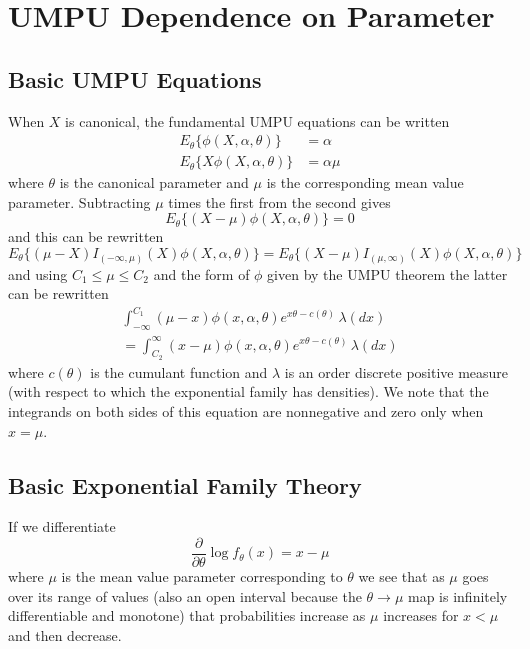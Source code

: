 \documentclass[11pt]{article}
\begin{document}
\section{UMPU Dependence on Parameter}

\subsection{Basic UMPU Equations}

When $X$ is canonical, the fundamental UMPU equations can be written
\begin{subequations}
\begin{align}
   E_\theta\{ \phi(X, \alpha, \theta) \} & = \alpha
   \label{eq:umpu-a}
   \\
   E_\theta\{ X \phi(X, \alpha, \theta) \} & = \alpha \mu
   \label{eq:umpu-b}
\end{align}
\end{subequations}
where $\theta$ is the canonical parameter and $\mu$ is the corresponding
mean value parameter.
Subtracting $\mu$ times the first from the second gives
$$
   E_\theta\{ (X - \mu) \phi(X, \alpha, \theta) \} = 0
$$
and this can be rewritten
$$
   E_\theta\{ (\mu - X) I_{(- \infty, \mu)}(X) \phi(X, \alpha, \theta) \}
   =
   E_\theta\{ (X - \mu) I_{(\mu, \infty)}(X) \phi(X, \alpha, \theta) \}
$$
and using $C_1 \le \mu \le C_2$ and the form of $\phi$ given
by the UMPU theorem the latter can be rewritten
\begin{multline*}
   \int_{- \infty}^{C_1} (\mu - x) \phi(x, \alpha, \theta)
   e^{x \theta - c(\theta)} \, \lambda(d x)
   \\
   =
   \int_{C_2}^\infty (x - \mu) \phi(x, \alpha, \theta)
   e^{x \theta - c(\theta)} \, \lambda(d x)
\end{multline*}
where $c(\theta)$ is the cumulant function and $\lambda$ is an order
discrete positive measure (with respect to which the exponential family
has densities).  We note that the integrands on both sides of this
equation are nonnegative and zero only when $x = \mu$.

\subsection{Basic Exponential Family Theory}

If we differentiate
$$
   \frac{\partial}{\partial \theta} \log f_\theta(x) = x - \mu
$$
where $\mu$ is the mean value parameter corresponding to $\theta$
we see that as $\mu$ goes over its range of values (also an open interval
because the $\theta \to \mu$ map is infinitely differentiable and monotone)
that probabilities increase as $\mu$ increases for $x < \mu$ and then decrease.
\end{document}
